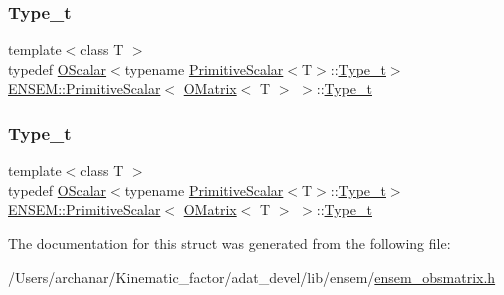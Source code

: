 \subsubsection{\texorpdfstring{Type\_t}{Type\_t}\hspace{0.1cm}{\footnotesize\ttfamily [1/2]}}
{\footnotesize\ttfamily template$<$class T $>$ \\
typedef \mbox{\hyperlink{classENSEM_1_1OScalar}{O\+Scalar}}$<$typename \mbox{\hyperlink{structENSEM_1_1PrimitiveScalar}{Primitive\+Scalar}}$<$T$>$\+::\mbox{\hyperlink{structENSEM_1_1PrimitiveScalar_3_01OMatrix_3_01T_01_4_01_4_a4e7f325878a1ec4acea1a745cbd24af6}{Type\+\_\+t}}$>$ \mbox{\hyperlink{structENSEM_1_1PrimitiveScalar}{E\+N\+S\+E\+M\+::\+Primitive\+Scalar}}$<$ \mbox{\hyperlink{classENSEM_1_1OMatrix}{O\+Matrix}}$<$ T $>$ $>$\+::\mbox{\hyperlink{structENSEM_1_1PrimitiveScalar_3_01OMatrix_3_01T_01_4_01_4_a4e7f325878a1ec4acea1a745cbd24af6}{Type\+\_\+t}}}

\mbox{\label{structENSEM_1_1PrimitiveScalar_3_01OMatrix_3_01T_01_4_01_4_a4e7f325878a1ec4acea1a745cbd24af6}} 
\subsubsection{\texorpdfstring{Type\_t}{Type\_t}\hspace{0.1cm}{\footnotesize\ttfamily [2/2]}}
{\footnotesize\ttfamily template$<$class T $>$ \\
typedef \mbox{\hyperlink{classENSEM_1_1OScalar}{O\+Scalar}}$<$typename \mbox{\hyperlink{structENSEM_1_1PrimitiveScalar}{Primitive\+Scalar}}$<$T$>$\+::\mbox{\hyperlink{structENSEM_1_1PrimitiveScalar_3_01OMatrix_3_01T_01_4_01_4_a4e7f325878a1ec4acea1a745cbd24af6}{Type\+\_\+t}}$>$ \mbox{\hyperlink{structENSEM_1_1PrimitiveScalar}{E\+N\+S\+E\+M\+::\+Primitive\+Scalar}}$<$ \mbox{\hyperlink{classENSEM_1_1OMatrix}{O\+Matrix}}$<$ T $>$ $>$\+::\mbox{\hyperlink{structENSEM_1_1PrimitiveScalar_3_01OMatrix_3_01T_01_4_01_4_a4e7f325878a1ec4acea1a745cbd24af6}{Type\+\_\+t}}}



The documentation for this struct was generated from the following file\+:\begin{DoxyCompactItemize}
\item 
/\+Users/archanar/\+Kinematic\+\_\+factor/adat\+\_\+devel/lib/ensem/\mbox{\hyperlink{lib_2ensem_2ensem__obsmatrix_8h}{ensem\+\_\+obsmatrix.\+h}}\end{DoxyCompactItemize}
